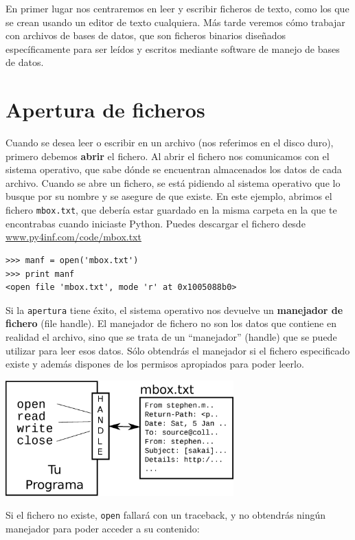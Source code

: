 En primer lugar nos centraremos en leer y escribir ficheros de texto,
como los que se crean usando un editor de texto cualquiera. Más tarde veremos cómo
trabajar con archivos de bases de datos, que son ficheros binarios diseñados
específicamente para ser leídos y escritos mediante software de manejo de bases de datos.

\section{Apertura de ficheros}

Cuando se desea leer o escribir en un archivo (nos referimos en el disco duro), primero
debemos {\bf abrir} el fichero. Al abrir el fichero nos comunicamos con el sistema
operativo, que sabe dónde se encuentran almacenados los datos de cada archivo. Cuando se
abre un fichero, se está pidiendo al sistema operativo que lo busque por su nombre
y se asegure de que existe. En este ejemplo, abrimos el fichero
{\tt mbox.txt}, que debería estar guardado en la misma carpeta en la que te
encontrabas cuando iniciaste Python.
Puedes descargar el fichero desde
\url{www.py4inf.com/code/mbox.txt}

\beforeverb
\begin{verbatim}
>>> manf = open('mbox.txt')
>>> print manf
<open file 'mbox.txt', mode 'r' at 0x1005088b0>
\end{verbatim}
\afterverb
%
Si la {\tt apertura} tiene éxito, el sistema operativo nos devuelve un
{\bf manejador de fichero} (file handle). El manejador de fichero no son los datos que
contiene en realidad el archivo, sino que se trata de un ``manejador'' (handle) que se
puede utilizar para leer esos datos. Sólo obtendrás el manejador si el fichero especificado
existe y además dispones de los permisos apropiados para poder leerlo.

\beforefig
\centerline{\includegraphics[height=1.75in]{figs2/handle.eps}}
\afterfig

Si el fichero no existe, {\tt open} fallará con un traceback, y no obtendrás
ningún manejador para poder acceder a su contenido:

